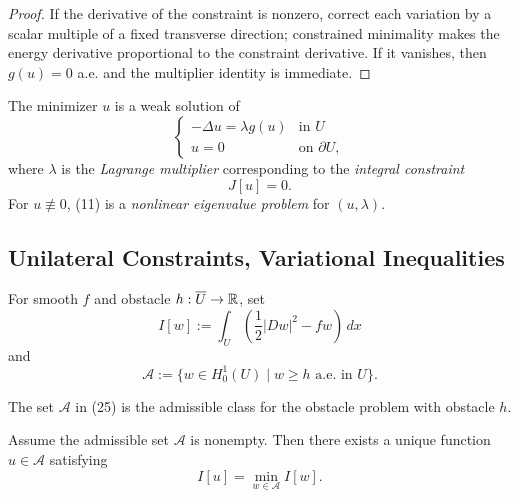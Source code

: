 \begin{proof}
\sketch If the derivative of the constraint is nonzero, correct each variation by a scalar multiple of a fixed transverse direction; constrained minimality makes the energy derivative proportional to the constraint derivative. If it vanishes, then $g(u)=0$ a.e. and the multiplier identity is immediate.
\end{proof}

\begin{remark}
\label{rem:nonlinear-eigenvalue-lagrange-multiplier-interpretation}

The minimizer $u$ is a weak solution of
\[
\begin{cases}
-\Delta u = \lambda g(u) & \text{in } U \\
u = 0 & \text{on } \partial U,
\end{cases}
\tag{11}
\]
where $\lambda$ is the \textit{Lagrange multiplier} corresponding to the \textit{integral constraint}
\[
J[u] = 0.
\tag{12}
\]
For $u\not\equiv0$, (11) is a \textit{nonlinear eigenvalue problem} for $(u,\lambda)$.
\end{remark}

\subsection{Unilateral Constraints, Variational Inequalities}
\label{sec:unilateral-constraints-variational-inequalities}

For smooth $f$ and obstacle $h:\overline U\to\mathbb{R}$, set
\[
I[w]:=\int_U\left(\frac12|Dw|^2-fw\right)\,dx
\tag{24}
\]
and
\[
\mathcal A:=\{w\in H_0^1(U)\mid w\geq h\text{ a.e. in }U\}.
\tag{25}
\]

\begin{definition}
\label{def:admissible-class-obstacle-problem}
The set $\mathcal A$ in (25) is the admissible class for the obstacle problem with obstacle $h$.
\end{definition}

\begin{theorem}
\label{thm:existence-minimizer-obstacle-problem}

Assume the admissible set $\mathcal{A}$ is nonempty. Then there exists a unique function $u \in \mathcal{A}$ satisfying
\[
I[u] = \min_{w \in \mathcal{A}} I[w].
\]
\end{theorem}

